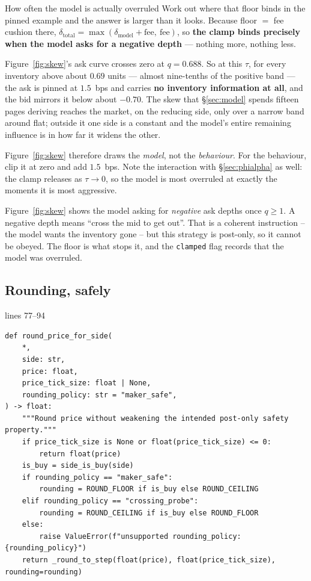 \documentclass[11pt,a4paper]{article}
\newcommand{\code}[1]{\texttt{\small #1}}
\newcommand{\snip}[3]{%
  \par\addvspace{6pt}\noindent
  {\footnotesize\color{NavyLink}\texttt{\detokenize{#1}}\quad lines #2--#3}%
  \par\nobreak\vspace{1pt}}
\begin{document}
\begin{trap}{How often the model is actually overruled}
Work out where that floor binds in the pinned example and the answer is larger
than it looks. Because floor $=$ fee cushion there,
$\delta_{\text{total}} = \max(\delta_{\text{model}} +
\text{fee},\ \text{fee})$, so \textbf{the clamp binds precisely when the model
asks for a negative depth} --- nothing more, nothing less.

Figure~\ref{fig:skew}'s ask curve crosses zero at
$q = 0.688$. So at this $\tau$, for every inventory above about $0.69$ units ---
almost nine-tenths of the positive band --- the ask is pinned at $1.5$~bps and carries
\textbf{no inventory information at all}, and the bid mirrors it below about $-0.70$.
The skew that \S\ref{sec:model} spends fifteen pages deriving reaches the market,
on the reducing side, only over a narrow band around flat; outside it one side
is a constant and the model's entire remaining influence is in how far it widens
the other.

Figure~\ref{fig:skew} therefore draws the \emph{model}, not the
\emph{behaviour}. For the behaviour, clip it at zero and add $1.5$~bps. Note the
interaction with \S\ref{sec:phialpha} as well: the clamp releases as
$\tau \to 0$, so the model is most overruled at exactly the moments it is most
aggressive.
\end{trap}

\begin{intuition}[breakable=false]
Figure~\ref{fig:skew} shows the model asking for \emph{negative} ask depths once
$q \ge 1$. A negative depth means ``cross the mid to get out''. That is a
coherent instruction -- the model wants the inventory gone -- but this strategy
is post-only, so it cannot be obeyed. The floor is what stops it, and the
\code{clamped} flag records that the model was overruled.
\end{intuition}

\subsection{Rounding, safely}

\snip{scripts/mm_core.py}{77}{94}
\begin{lstlisting}
def round_price_for_side(
    *,
    side: str,
    price: float,
    price_tick_size: float | None,
    rounding_policy: str = "maker_safe",
) -> float:
    """Round price without weakening the intended post-only safety property."""
    if price_tick_size is None or float(price_tick_size) <= 0:
        return float(price)
    is_buy = side_is_buy(side)
    if rounding_policy == "maker_safe":
        rounding = ROUND_FLOOR if is_buy else ROUND_CEILING
    elif rounding_policy == "crossing_probe":
        rounding = ROUND_CEILING if is_buy else ROUND_FLOOR
    else:
        raise ValueError(f"unsupported rounding_policy: {rounding_policy}")
    return _round_to_step(float(price), float(price_tick_size), rounding=rounding)
\end{lstlisting}
\end{document}
